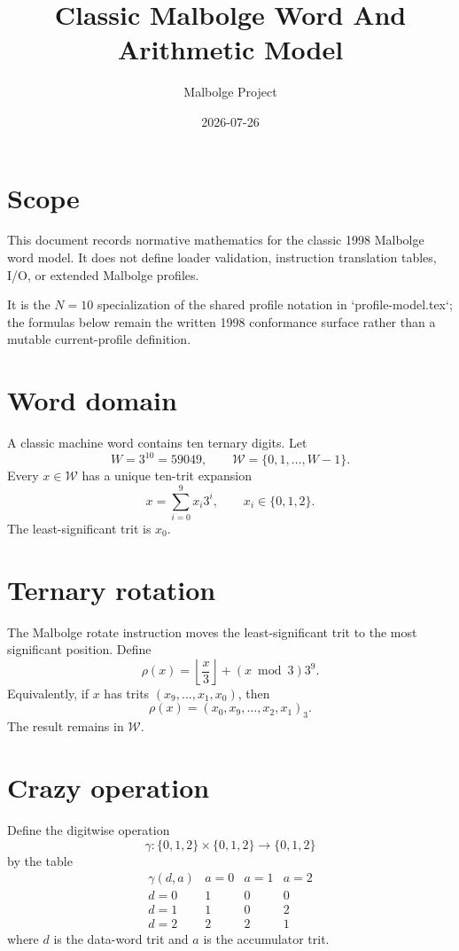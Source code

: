 \documentclass{article}
\title{Classic Malbolge Word And Arithmetic Model}
\author{Malbolge Project}
\date{2026-07-26}
\begin{document}
\maketitle

\section{Scope}

This document records normative mathematics for the classic 1998 Malbolge word
model. It does not define loader validation, instruction translation tables,
I/O, or extended Malbolge profiles.

It is the $N=10$ specialization of the shared profile notation in
`profile-model.tex`; the formulas below remain the written 1998 conformance
surface rather than a mutable current-profile definition.

\section{Word domain}

A classic machine word contains ten ternary digits. Let
\begin{equation}
  W = 3^{10} = 59049,
  \qquad
  \mathcal{W} = \{0,1,\ldots,W-1\}.
  \label{eq:classic-word-domain}
\end{equation}
Every $x\in\mathcal{W}$ has a unique ten-trit expansion
\[
  x = \sum_{i=0}^{9} x_i 3^i,
  \qquad
  x_i\in\{0,1,2\}.
\]
The least-significant trit is $x_0$.

\section{Ternary rotation}

The Malbolge rotate instruction moves the least-significant trit to the most
significant position. Define
\begin{equation}
  \rho(x)
    = \left\lfloor\frac{x}{3}\right\rfloor
      + (x\bmod 3)3^9.
  \label{eq:classic-rotate}
\end{equation}
Equivalently, if $x$ has trits $(x_9,\ldots,x_1,x_0)$, then
\[
  \rho(x) = (x_0,x_9,\ldots,x_2,x_1)_3.
\]
The result remains in $\mathcal{W}$.

\section{Crazy operation}

Define the digitwise operation
\[
  \gamma : \{0,1,2\}\times\{0,1,2\}\to\{0,1,2\}
\]
by the table
\[
\begin{array}{c|ccc}
\gamma(d,a) & a=0 & a=1 & a=2 \\
\hline
 d=0 & 1 & 0 & 0 \\
 d=1 & 1 & 0 & 2 \\
 d=2 & 2 & 2 & 1
\end{array}
\]
where $d$ is the data-word trit and $a$ is the accumulator trit.
\end{document}
